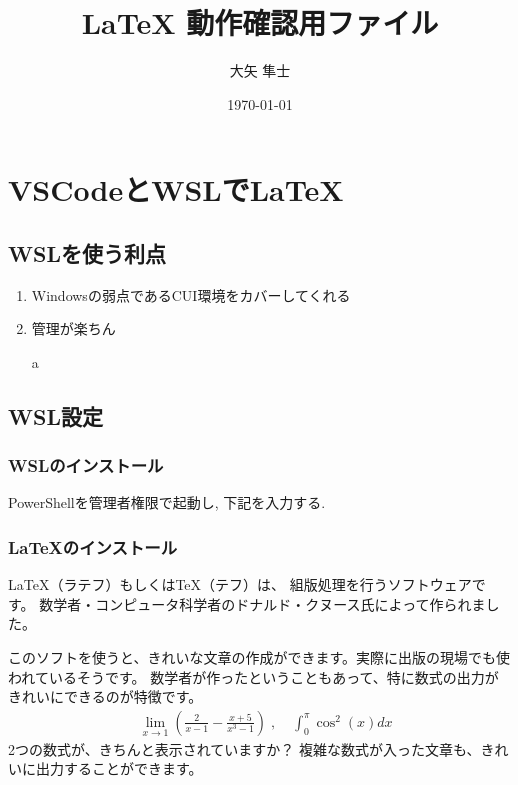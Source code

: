 \documentclass[a4j,12pt]{jreport}
\title{ {\LaTeX} 動作確認用ファイル}
\author{大矢 隼士}
\date{\today}
\begin{document}
    \maketitle
    \tableofcontents

    \chapter{VSCodeとWSLで\LaTeX }
        \section{WSLを使う利点}
            \begin{enumerate}
                \item Windowsの弱点であるCUI環境をカバーしてくれる
                
                \item 管理が楽ちん
                
                a

            \end{enumerate}
            

        \section{WSL設定}
            \subsection{WSLのインストール}
                PowerShellを管理者権限で起動し, 下記を入力する. 
            
            \subsection{\LaTeX のインストール}
                \LaTeX（ラテフ）もしくは\TeX（テフ）は、
                組版処理を行うソフトウェアです。
                数学者・コンピュータ科学者のドナルド・クヌース氏によって作られました。

                このソフトを使うと、きれいな文章の作成ができます。実際に出版の現場でも使われているそうです。
                数学者が作ったということもあって、特に数式の出力がきれいにできるのが特徴です。
                \begin{eqnarray}
                    & \displaystyle \lim _{x \rightarrow 1} \left( \frac{2}{x-1} - \frac{x+5}{x^3 -1} \right)\; ,\; 
                    & \displaystyle \int ^\pi _0 \cos ^2 (x)dx \nonumber
                \end{eqnarray}
                2つの数式が、きちんと表示されていますか？
                複雑な数式が入った文章も、きれいに出力することができます。
\end{document}
